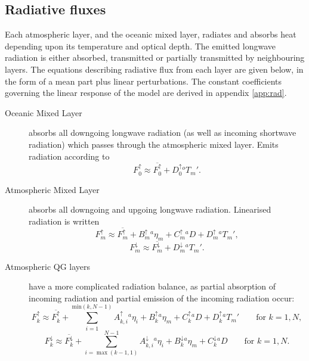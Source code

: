 \documentclass[11pt, a4paper,twoside]{article}
\newcommand{\etb}[2]{{{}^{#1}\eta_{#2}}}
\newcommand{\T}[2]{{{}^{#1}T_{#2}}}
\newcommand{\aup}[1]{A^{\uparrow}_{#1}}
\newcommand{\adown}[1]{A^{\downarrow}_{#1}}
\newcommand{\bup}[1]{B^{\uparrow}_{#1}}
\newcommand{\cupp}[1]{C^{\uparrow}_{#1}}
\newcommand{\bdown}[1]{B^{\downarrow}_{#1}}
\newcommand{\cdown}[1]{C^{\downarrow}_{#1}}
\newcommand{\dup}[1]{D^{\uparrow}_{#1}}
\newcommand{\ddown}[1]{D^{\downarrow}_{#1}}
\newcommand{\Fup}[1]{{F^{\uparrow}_{#1}}}
\newcommand{\Fdown}[1]{{F^{\downarrow}_{#1}}}
\newcommand{\D}[1]{{}^{#1}D}
\numberwithin{equation}{section}
\begin{document}
\subsection{Radiative fluxes} \label{sub:rad}
Each atmospheric layer, and the oceanic mixed layer, radiates and absorbs heat depending upon its temperature and optical depth.
The emitted longwave radiation is either absorbed, transmitted or partially transmitted by neighbouring layers.
The equations describing radiative flux from each layer are given below, in the form of a mean part plus linear perturbations.
The constant coefficients governing the linear response of the model are derived in appendix \ref{app:rad}.

\begin{description}
\item[Oceanic Mixed Layer] absorbs all downgoing longwave radiation (as well as incoming shortwave radiation) which passes through the atmospheric mixed layer.
Emits radiation according to
\begin{equation}
\Fup{0} \approx \overline{\Fup{0}} + \dup{0}\T{o}{m}'.
\end{equation}

\item[Atmospheric Mixed Layer] absorbs all downgoing and upgoing longwave radiation.
Linearised radiation is written
\begin{equation}\label{eq:fmup}
\Fup{m} \approx \overline{\Fup{m}} + \bup{m} \etb{a}{m} + \cupp{m} \D{a} + \dup{m} \T{a}{m}',
\end{equation}
\begin{equation}\label{eq:fmdown}
\Fdown{m} \approx \overline{\Fdown{m}} + \ddown{m}\T{a}{m}' .
\end{equation}

\item[Atmospheric QG layers] have a more complicated radiation balance, as partial absorption of incoming radiation and partial emission of the incoming radiation occur:
\begin{equation}\label{eq:fkup}
\Fup{k} \approx \overline{\Fup{k}} + \sum_{i=1}^{\textrm{min}(k,N-1)}\aup{k,i}\etb{a}{i} + \bup{k} \etb{a}{m} + \cupp{k} \D{a} + \dup{k}\T{a}{m}'\quad \quad \textrm{for }k=1,N,
\end{equation}
\begin{equation}\label{eq:fkdown}
\Fdown{k} \approx \overline{\Fdown{k}} + \sum_{i=\max(k-1,1)}^{N-1} \adown{k,i} \etb{a}{i} + \bdown{k} \etb{a}{m} + \cdown{k} \D{a} \quad \quad \textrm{for }k=1,N.
\end{equation}
\end{description}
\end{document}
